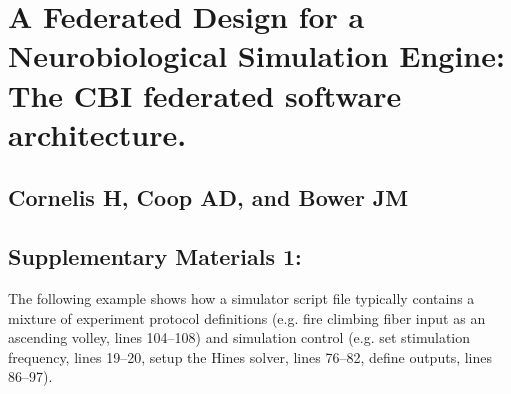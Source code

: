 \documentclass[10pt]{article}
\begin{document}
\section*{A Federated Design for a Neurobiological Simulation Engine: 
The CBI federated software architecture.}
\subsection*{Cornelis H, Coop AD, and Bower JM}
\subsection*{Supplementary Materials 1:} 

The following example shows how a simulator script file typically contains a mixture of experiment protocol definitions  (e.g. fire climbing fiber input as an ascending volley, lines 104--108) and simulation control (e.g. set stimulation frequency, lines 19--20, setup the Hines solver, lines 76--82, define outputs, lines 86--97).
\end{document}
